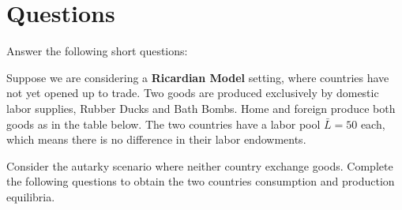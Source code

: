 \documentclass[12pt]{exam}
\begin{document}
\section*{Questions}
\begin{questions}

\question[20]
Answer the following short questions:


\newpage 

\question[30]
Suppose we are considering a \textbf{Ricardian Model} setting, where countries have not yet opened up to trade. 
Two goods are produced exclusively by domestic labor supplies, Rubber Ducks and Bath Bombs. 
Home and foreign produce both goods as in the table below. 
The two countries have a labor pool $\bar{L} = 50$ each, which means there is no difference in their labor endowments. 



Consider the autarky scenario where neither country exchange goods. 
Complete the following questions to obtain the two countries consumption and production equilibria. 

\end{questions}
\end{document}
